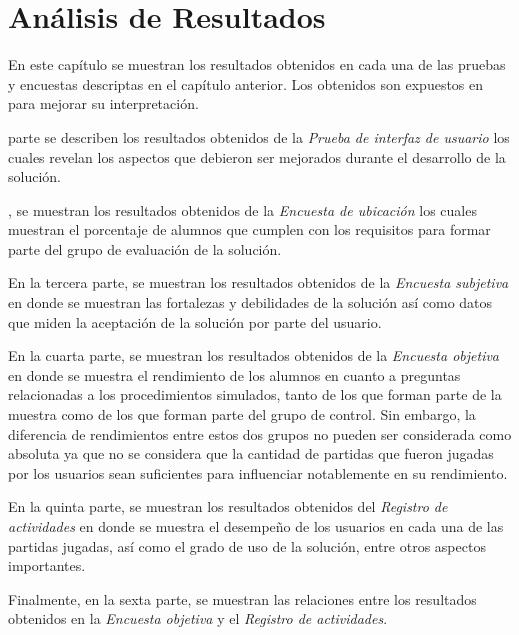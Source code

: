\chapter{Análisis de Resultados}
\label{chap:analisis}




En este capítulo se muestran los resultados obtenidos en cada una de las pruebas
y encuestas descriptas en el capítulo anterior. Los 
obtenidos son expuestos en  para mejorar su
interpretación.

 parte se describen los resultados obtenidos de la
\emph{Prueba de interfaz de usuario} los cuales revelan los aspectos que
debieron ser mejorados durante el desarrollo de la solución. 

, se muestran los resultados obtenidos de
la \emph{Encuesta de ubicación} los cuales muestran el porcentaje de alumnos que
cumplen con los requisitos para formar parte del grupo de evaluación de la
solución.

En la tercera parte, se muestran los resultados obtenidos de la \emph{Encuesta
subjetiva} en donde se muestran las fortalezas y debilidades de la solución así
como datos que miden la aceptación de la solución por parte del usuario. 

En la cuarta parte, se muestran los resultados obtenidos de la \emph{Encuesta
objetiva} en donde se muestra el rendimiento de los alumnos en cuanto a
preguntas relacionadas a los procedimientos simulados, tanto de los que forman
parte de la muestra como de los que forman parte del grupo de control. Sin
embargo, la diferencia de rendimientos entre estos dos grupos no pueden ser
considerada como absoluta ya que no se considera que la cantidad de partidas que
fueron jugadas por los usuarios sean suficientes para influenciar notablemente
en su rendimiento.

En la quinta parte, se muestran los resultados obtenidos del \emph{Registro de
actividades} en donde se muestra el desempeño de los usuarios en cada una de las
partidas jugadas, así como el grado de uso de la solución, entre otros aspectos
importantes.

Finalmente, en la sexta parte, se muestran las relaciones entre los resultados
obtenidos en la \emph{Encuesta objetiva} y el \emph{Registro de actividades}.








%



